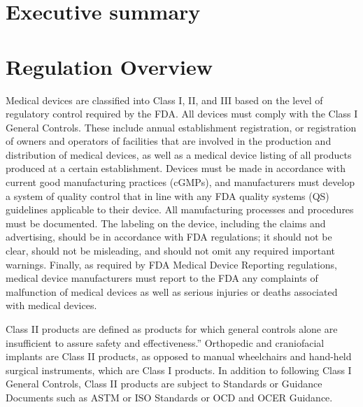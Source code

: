 \documentclass{article}
\begin{document}

\setcounter{tocdepth}{3}
\tableofcontents
\newpage

\section*{Executive summary}
\label{sec:exec-summary}

\section{Regulation Overview}
\label{sec:test-administration}

	Medical devices are classified into Class I, II, and III based on the level of regulatory control required by the FDA. All devices must comply with the Class I General Controls. These include annual establishment registration, or registration of owners and operators of facilities that are involved in the production and distribution of medical devices, as well as a medical device listing of all products produced at a certain establishment. Devices must be made in accordance with current good manufacturing practices (cGMPs), and manufacturers must develop a system of quality control that in line with any FDA quality systems (QS) guidelines applicable to their device. All manufacturing processes and procedures must be documented. The labeling on the device, including the claims and advertising, should be in accordance with FDA regulations; it should not be clear, should not be misleading, and should not omit any required important warnings. Finally, as required by FDA Medical Device Reporting regulations, medical device manufacturers must report to the FDA any complaints of malfunction of medical devices as well as serious injuries or deaths associated with medical devices. 

Class II products are defined as products for which general controls alone are
insufficient to assure safety and effectiveness.” Orthopedic and craniofacial implants are Class II products, as opposed to manual wheelchairs and hand-held surgical instruments, which are Class I products.  In addition to following Class I General Controls, Class II products are subject to Standards or Guidance Documents such as ASTM or ISO Standards or OCD and OCER Guidance. 
\end{document}
